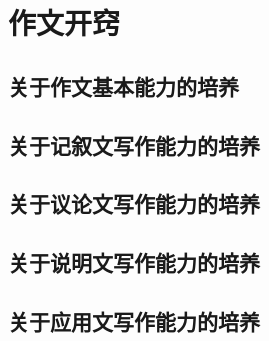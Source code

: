 \part{作文开窍}
    \setcounter{chapter}{0}
    \chapter{关于作文基本能力的培养}
        
        
        
        
        
        
    \chapter{关于记叙文写作能力的培养}
        
        
        
    \chapter{关于议论文写作能力的培养}
        
        
        
    \chapter{关于说明文写作能力的培养}
        
        
    \chapter{关于应用文写作能力的培养}
        
        
        